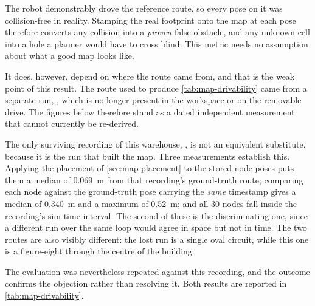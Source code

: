 The robot demonstrably drove the reference route, so every pose on it was
collision-free in reality. Stamping the real footprint onto the map at each pose
therefore converts any collision into a \emph{proven} false obstacle, and any
unknown cell into a hole a planner would have to cross blind. This metric needs no
assumption about what a good map looks like.

It does, however, depend on where the route came from, and that is the weak point
of this result. The route used to produce \cref{tab:map-drivability} came from a
separate run, , which is no longer present in
the workspace or on the removable drive. The figures below therefore stand as a
dated independent measurement that cannot currently be re-derived.

The only surviving recording of this warehouse, ,
is not an equivalent substitute, because it is the run that built the map. Three
measurements establish this. Applying the placement of
\cref{sec:map-placement} to the stored node poses puts them a median of
\SI{0.069}{\metre} from that recording's ground-truth route; comparing each node
against the ground-truth pose carrying the \emph{same} timestamp gives a median
of \SI{0.340}{\metre} and a maximum of \SI{0.52}{\metre}; and all \num{30}
nodes fall inside the recording's sim-time interval. The second of these is the
discriminating one, since a different run over the same loop would agree in space
but not in time. The two routes are also visibly different: the lost run is a
single oval circuit, while this one is a figure-eight through the centre of the
building.

The evaluation was nevertheless repeated against this recording, and the outcome
confirms the objection rather than resolving it. Both results are reported in
\cref{tab:map-drivability}.

